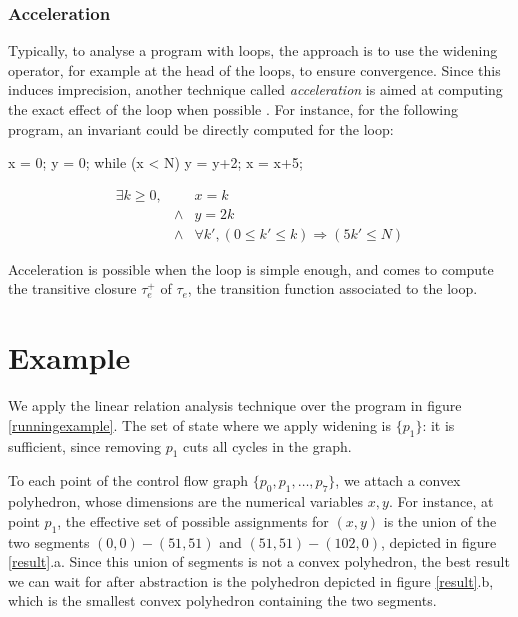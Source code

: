 \documentclass[a4paper,english,titlepage,11pt]{report}
\begin{document}
\subsubsection{Acceleration}

Typically, to analyse a program with loops, the approach is to use the
widening operator, for example at the head of the loops, to ensure convergence.
Since this induces imprecision, another technique called \emph{acceleration}
is aimed at computing the exact effect of the loop when possible \cite{Gon07,GH06}. For instance, for
the following program, an invariant could be directly computed for the loop:


\begin{minipage}[c]{.39\linewidth}
\begin{C}
x = 0;
y = 0;
while (x < N) {
	y = y+2;
	x = x+5;
}
\end{C}
\end{minipage} 
\begin{minipage}[c]{.59\linewidth}
$$\begin{array}{llll}
\exists k \geq 0,& & x  = k \\
		&\wedge & y = 2k \\
		&\wedge & \forall k', (0 \leq k' \leq k)
				\Rightarrow (5k' \leq N)
\end{array}$$
\end{minipage}

Acceleration is possible when the loop is simple enough, and comes to compute
the transitive closure $\tau_e^+$ of $\tau_e$, the transition function
associated to the loop.

\section{Example}

We apply the linear relation analysis technique over the program in figure
\ref{runningexample}. The set of state where we apply widening is $\{p_1\}$: it
is sufficient, since removing $p_1$ cuts all cycles in the graph.

To each point of the control flow graph $\{p_0, p_1,\dots, p_7\}$, we attach a
convex polyhedron, whose dimensions are the numerical variables $x,y$.
For instance, at point $p_1$, the effective set of possible assignments for
$(x,y)$ is the union of the two segments $(0,0) - (51,51)$ and $(51,51) -
(102,0)$, depicted in figure \ref{result}.a. Since this union of segments is not
a convex polyhedron, the best result we can wait for after abstraction is the
polyhedron depicted in figure \ref{result}.b, which is the smallest convex
polyhedron containing the two segments.
\end{document}
